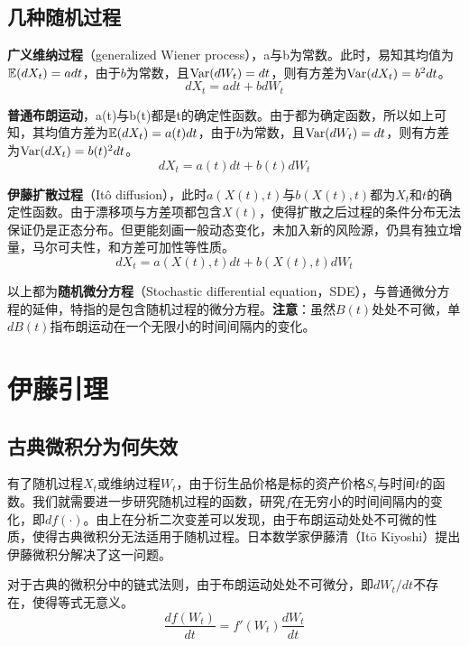\documentclass[11pt]{article}
\begin{document}
\subsection{几种随机过程}

\textbf{广义维纳过程}（generalized Wiener process），a与b为常数。此时，易知其均值为$\mathbb{E}(dX_t) = adt$，由于$b$为常数，且$\operatorname{Var}(dW_t)=dt$，则有方差为$\operatorname{Var}(dX_t)=b^2 dt$。
\begin{equation*}
    dX_t = a dt + b dW_t
\end{equation*}

\textbf{普通布朗运动}，a(t)与b(t)都是t的确定性函数。由于都为确定函数，所以如上可知，其均值方差为$\mathbb{E}(dX_t) = a(t)dt$，由于$b$为常数，且$\operatorname{Var}(dW_t)=dt$，则有方差为$\operatorname{Var}(dX_t)=b(t)^2 dt$。
\begin{equation*}
    dX_t = a(t) dt + b(t) dW_t
\end{equation*}

\textbf{伊藤扩散过程}（Itô diffusion），此时$a(X(t),t)$与$b(X(t),t)$都为$X_t$和$t$的确定性函数。由于漂移项与方差项都包含$X(t)$，使得扩散之后过程的条件分布无法保证仍是正态分布。但更能刻画一般动态变化，未加入新的风险源，仍具有独立增量，马尔可夫性，和方差可加性等性质。
\begin{equation*}
    dX_t =a(X(t),t) dt + b(X(t),t) dW_t
\end{equation*}

以上都为\textbf{随机微分方程}（Stochastic differential equation，SDE），与普通微分方程的延伸，特指的是包含随机过程的微分方程。\textbf{注意}：虽然$B(t)$处处不可微，单$dB(t)$指布朗运动在一个无限小的时间间隔内的变化。

\section{伊藤引理}

\subsection{古典微积分为何失效}

有了随机过程$X_t$或维纳过程$W_t$，由于衍生品价格是标的资产价格$S_t$与时间$t$的函数。我们就需要进一步研究随机过程的函数，研究$f$在无穷小的时间间隔内的变化，即$df(\cdot)$。由上在分析二次变差可以发现，由于布朗运动处处不可微的性质，使得古典微积分无法适用于随机过程。日本数学家伊藤清（Itō Kiyoshi）提出伊藤微积分解决了这一问题。

对于古典的微积分中的链式法则，由于布朗运动处处不可微分，即$dW_t/dt$不存在，使得等式无意义。
\begin{equation*}
    \frac{df(W_t)}{dt} = f'(W_t)\frac{dW_t}{dt}
\end{equation*}
\end{document}
